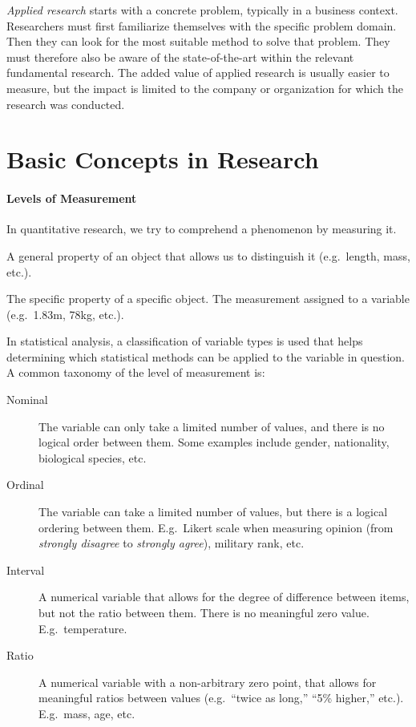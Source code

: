 \emph{Applied research} starts with a concrete problem, typically in a business context. Researchers must first familiarize themselves with the specific problem domain. Then they can look for the most suitable method to solve that problem. They must therefore also be aware of the state-of-the-art within the relevant fundamental research. The added value of applied research is usually easier to measure, but the impact is limited to the company or organization for which the research was conducted.

\section{Basic Concepts in Research}

\paragraph{Levels of Measurement}

In quantitative research, we try to comprehend a phenomenon by measuring it.

\begin{definition}[Variable]
     A general property of an object that allows us to distinguish it (e.g.~length, mass, etc.).
\end{definition}

\begin{definition}[Value]
    The specific property of a specific object. The measurement assigned to a variable (e.g.~1.83m, 78kg, etc.).
\end{definition}

In statistical analysis, a classification of variable types is used that helps determining which statistical methods can be applied to the variable in question. A common taxonomy of the level of measurement is:

\begin{description}
	\item [Nominal] The variable can only take a limited number of values, and there is no logical order between them. Some examples include gender, nationality, biological species, etc.
	\item [Ordinal] The variable can take a limited number of values, but there is a logical ordering between them. E.g.~Likert scale when measuring opinion (from \emph{strongly disagree} to \emph{strongly agree}), military rank, etc.
	\item [Interval] A numerical variable that allows for the degree of difference between items, but not the ratio between them. There is no meaningful zero value. E.g.~temperature.
	\item [Ratio] A numerical variable with a non-arbitrary zero point, that allows for meaningful ratios between values (e.g.~``twice as long,'' ``5\% higher,'' etc.). E.g.~mass, age, etc.
\end{description}

